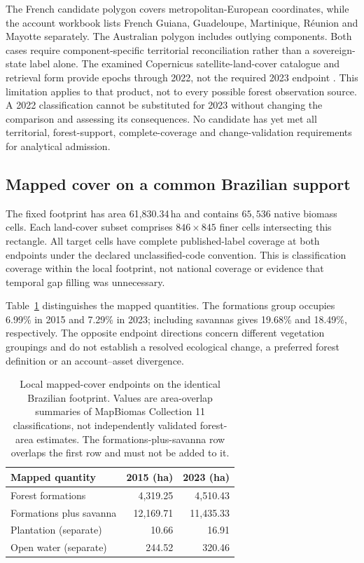 \documentclass[11pt,a4paper]{article}
\begin{document}
The French candidate polygon covers metropolitan-European coordinates, while the account workbook lists French Guiana, Guadeloupe, Martinique, R\'eunion and Mayotte separately. The Australian polygon includes outlying components. Both cases require component-specific territorial reconciliation rather than a sovereign-state label alone. The examined Copernicus satellite-land-cover catalogue and retrieval form provide epochs through 2022, not the required 2023 endpoint \citep{CDS2026}. This limitation applies to that product, not to every possible forest observation source. A 2022 classification cannot be substituted for 2023 without changing the comparison and assessing its consequences. No candidate has yet met all territorial, forest-support, complete-coverage and change-validation requirements for analytical admission.

\subsection{Mapped cover on a common Brazilian support}
The fixed footprint has area 61,830.34\,ha and contains $65{,}536$ native biomass cells. Each land-cover subset comprises $846\times845$ finer cells intersecting this rectangle. All target cells have complete published-label coverage at both endpoints under the declared unclassified-code convention. This is classification coverage within the local footprint, not national coverage or evidence that temporal gap filling was unnecessary.

Table~\ref{tab:brazil_cover} distinguishes the mapped quantities. The formations group occupies 6.99\% in 2015 and 7.29\% in 2023; including savannas gives 19.68\% and 18.49\%, respectively. The opposite endpoint directions concern different vegetation groupings and do not establish a resolved ecological change, a preferred forest definition or an account--asset divergence.

\begin{table}[htbp]
\centering\small
\caption{Local mapped-cover endpoints on the identical Brazilian footprint. Values are area-overlap summaries of MapBiomas Collection 11 classifications, not independently validated forest-area estimates. The formations-plus-savanna row overlaps the first row and must not be added to it.}\label{tab:brazil_cover}
\begin{tabular}{lrr}
\toprule
Mapped quantity & 2015 (ha) & 2023 (ha)\\\midrule
Forest formations & 4,319.25 & 4,510.43 \\
Formations plus savanna & 12,169.71 & 11,435.33 \\
Plantation (separate) & 10.66 & 16.91 \\
Open water (separate) & 244.52 & 320.46 \\
\bottomrule
\end{tabular}
\end{table}
\end{document}
